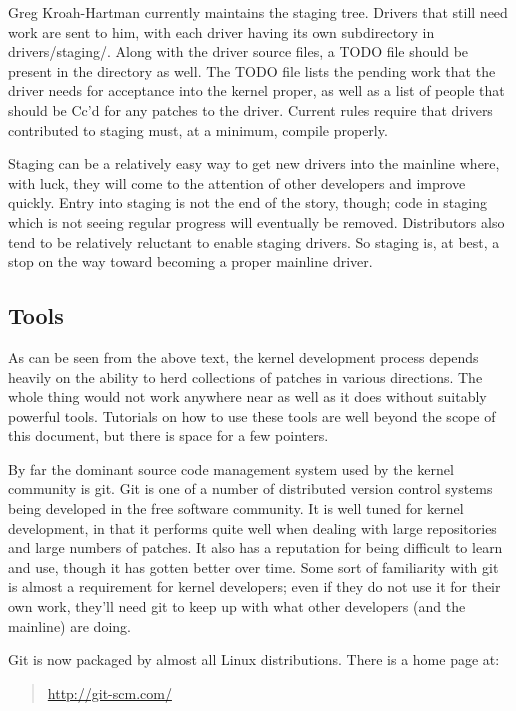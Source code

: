 \documentclass[a4paper,8pt,english]{sphinxmanual}
\begin{document}
Greg Kroah-Hartman currently maintains the staging tree.  Drivers that
still need work are sent to him, with each driver having its own
subdirectory in drivers/staging/.  Along with the driver source files, a
TODO file should be present in the directory as well.  The TODO file lists
the pending work that the driver needs for acceptance into the kernel
proper, as well as a list of people that should be Cc'd for any patches to
the driver.  Current rules require that drivers contributed to staging
must, at a minimum, compile properly.

Staging can be a relatively easy way to get new drivers into the mainline
where, with luck, they will come to the attention of other developers and
improve quickly.  Entry into staging is not the end of the story, though;
code in staging which is not seeing regular progress will eventually be
removed.  Distributors also tend to be relatively reluctant to enable
staging drivers.  So staging is, at best, a stop on the way toward becoming
a proper mainline driver.


\subsection{Tools}
\label{process/2.Process:tools}
As can be seen from the above text, the kernel development process depends
heavily on the ability to herd collections of patches in various
directions.  The whole thing would not work anywhere near as well as it
does without suitably powerful tools.  Tutorials on how to use these tools
are well beyond the scope of this document, but there is space for a few
pointers.

By far the dominant source code management system used by the kernel
community is git.  Git is one of a number of distributed version control
systems being developed in the free software community.  It is well tuned
for kernel development, in that it performs quite well when dealing with
large repositories and large numbers of patches.  It also has a reputation
for being difficult to learn and use, though it has gotten better over
time.  Some sort of familiarity with git is almost a requirement for kernel
developers; even if they do not use it for their own work, they'll need git
to keep up with what other developers (and the mainline) are doing.

Git is now packaged by almost all Linux distributions.  There is a home
page at:
\begin{quote}

\href{http://git-scm.com/}{http://git-scm.com/}
\end{quote}
\end{document}
